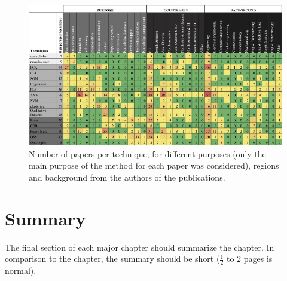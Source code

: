 \begin{figure}[t]
\centering
\includegraphics[width=16cm]{tables/PaperTable.jpg}
\caption{Number of papers per technique, for different purposes (only the main purpose of the method for each paper was considered), regions and background from the authors of the publications.}
\label{f:Papers Table}
\end{figure}


\section{Summary}
\label{s:Related-Works-Summary}

The final section of each major chapter should summarize the chapter. In comparison to the chapter, the summary should be short ($\frac{1}{2}$ to $2$ pages is normal).
